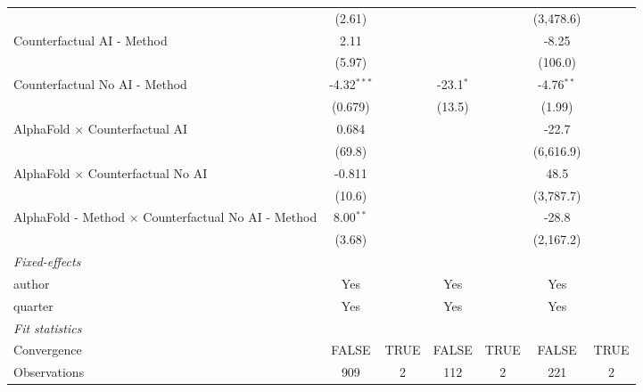 \begin{tabular}{lcccccc}
                                                              & (2.61)        &      &               &      & (3,478.6)    &   \\   
   Counterfactual AI - Method                                 & 2.11          &      &               &      & -8.25        &   \\   
                                                              & (5.97)        &      &               &      & (106.0)      &   \\   
   Counterfactual No AI - Method                              & -4.32$^{***}$ &      & -23.1$^{*}$   &      & -4.76$^{**}$ &   \\   
                                                              & (0.679)       &      & (13.5)        &      & (1.99)       &   \\   
   AlphaFold $\times$ Counterfactual AI                       & 0.684         &      &               &      & -22.7        &   \\   
                                                              & (69.8)        &      &               &      & (6,616.9)    &   \\   
   AlphaFold $\times$ Counterfactual No AI                    & -0.811        &      &               &      & 48.5         &   \\   
                                                              & (10.6)        &      &               &      & (3,787.7)    &   \\   
   AlphaFold - Method $\times$ Counterfactual No AI - Method  & 8.00$^{**}$   &      &               &      & -28.8        &   \\   
                                                              & (3.68)        &      &               &      & (2,167.2)    &   \\   
   \midrule
   \emph{Fixed-effects}\\
   author                                                     & Yes           &      & Yes           &      & Yes          & \\  
   quarter                                                    & Yes           &      & Yes           &      & Yes          & \\  
   \midrule
   \emph{Fit statistics}\\
   Convergence                                                &FALSE          & TRUE & FALSE         & TRUE & FALSE        & TRUE\\  
   Observations                                               & 909           & 2    & 112           & 2    & 221          & 2\\  

\end{tabular}
